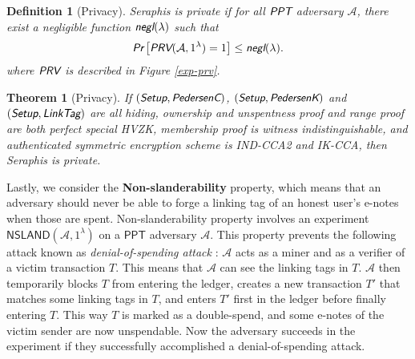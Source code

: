 \documentclass{article}
\newtheorem{definition}{Definition}[section]
\newtheorem{theorem}{Theorem}[section]
\begin{document}
\begin{definition}[Privacy]
Seraphis is private if for all $\emph{\textsf{PPT}}$ adversary $\mathcal{A}$, there exist a negligible function $\emph{\textsf{negl}}(\lambda)$ such that
\begin{align*}
\emph{\textsf{Pr}}
\left[
\emph{\textsf{PRV}}(\mathcal{A}, 1^{\lambda})=1
\right]
\le \emph{\textsf{negl}}(\lambda).
\end{align*}
where $\emph{\textsf{PRV}}$ is described in Figure \ref{exp-prv}.
\end{definition}
\begin{theorem}[Privacy]\label{thm-prv}
If $(\emph{\textsf{Setup}},\emph{\textsf{PedersenC}})$, $(\emph{\textsf{Setup}},\emph{\textsf{PedersenK}})$ and $(\emph{\textsf{Setup}},\emph{\textsf{LinkTag}})$ are all hiding, ownership and unspentness proof and range proof are both perfect special HVZK, membership proof is witness indistinguishable, and authenticated symmetric encryption scheme is IND-CCA2 and IK-CCA, then Seraphis is private.  
\end{theorem}

Lastly, we consider the \textbf{Non-slanderability} property, which means that an adversary should never be able to forge a linking tag of an honest user's e-notes when those are spent. Non-slanderability property involves an experiment $\textsf{NSLAND}(\mathcal{A}, 1^{\lambda})$ on a $\textsf{PPT}$ adversary $\mathcal{A}$. This property prevents the following attack known as \textit{denial-of-spending attack} \cite{denial-of-spend}: $\mathcal{A}$ acts as a miner and as a verifier of a victim transaction $T$. This means that $\mathcal{A}$ can see the linking tags in $T$. $\mathcal{A}$ then temporarily blocks $T$ from entering the ledger, creates a new transaction $T'$ that matches some linking tags in $T$, and enters $T'$ first in the ledger before finally entering $T$. This way $T$ is marked as a double-spend, and some e-notes of the victim sender are now unspendable. Now the adversary succeeds in the experiment if they successfully accomplished a denial-of-spending attack.
\end{document}
